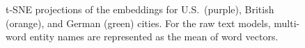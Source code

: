 \begin{figure}[t]
\caption{t-SNE projections of the embeddings for U.S.\ (purple), British (orange), and German (green) cities. For the raw text models, multi-word entity names are represented as the mean of word vectors.}
\label{fig:clust}
\end{figure}


